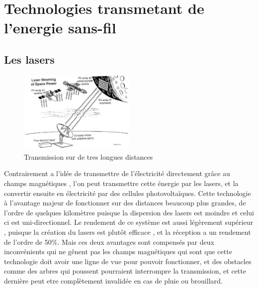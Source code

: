\documentclass[12pt]{report}
\begin{document}
\section{Technologies transmetant de l'energie sans-fil \cite{wiki5}}
  \subsection{Les lasers}
\begin{figure}
  \begin{center}
    \includegraphics[width=0.5\textwidth]{laser}
  \end{center}
  \caption{Transmission sur de tres longues distances}
\end{figure}Contrairement a l'idée de transmettre de l'électricité directement grâce au champs magnétiques , l'on peut transmettre cette énergie par les lasers, et la convertir ensuite en électricité par des cellules photovoltaïques. Cette technologie à l'avantage majeur de fonctionner sur des distances beaucoup plus grandes, de l'ordre de quelques kilomètres puisque la dispersion des lasers est moindre et celui ci est uni-directionnel. Le rendement de ce système est aussi légèrement supérieur , puisque la création du lasers est plutôt efficace , et la réception a un rendement de l'ordre de 50\%. Mais ces deux avantages sont compensés par deux inconvénients qui ne gênent pas les champs magnétiques qui sont que cette technologie doit avoir une ligne de vue pour pouvoir fonctionner, et des obstacles comme des arbres qui poussent pourraient interrompre la transmission, et cette dernière peut etre complètement invalidée en cas de pluie ou brouillard.
\end{document}
